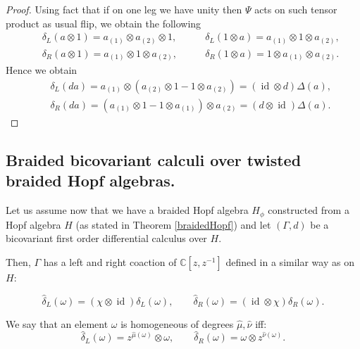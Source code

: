 \documentclass[12pt]{amsart}
\theoremstyle{definition}
\numberwithin{equation}{section}
\renewcommand{\a}{\chi}             %
\newcommand{\C}{\mathbb{C}}         %
\newcommand{\ox}{\otimes}           %
\DeclareMathOperator{\id}{id}       %
\begin{document}
\begin{proof}
Using fact that if on one leg we have unity then $\Psi$ acts on such tensor product as usual flip, we obtain the following
$$
\begin{aligned}
&& \delta_L(a\ox 1)=a_{(1)}\ox a_{(2)}\ox 1 , \qquad & \delta_L(1\ox a)=a_{(1)}\ox 1\ox a_{(2)}, \\
&& \delta_R(a\otimes 1)=a_{(1)}\ox 1 \ox a_{(2)}, \qquad & \delta_R(1\ox a)=1\ox a_{(1)}\ox a_{(2)}.
\end{aligned}
$$
Hence we obtain 
$$
\begin{aligned}
&& \delta_L(da)=a_{(1)}\ox\left(a_{(2)}\otimes 1-1\otimes a_{(2)}\right)=(\id\ox d)\Delta(a),\\
&& \delta_R(da)=\left(a_{(1)}\ox 1 -1\ox a_{(1)}\right)\ox a_{(2)}=(d\ox\id)\Delta(a).
\end{aligned}
$$
\end{proof}

\subsection{Braided bicovariant calculi over twisted braided Hopf algebras.}

Let us assume now that we have a braided Hopf algebra $H_\phi$ constructed from 
a Hopf algebra $H$ (as stated in Theorem \ref{braidedHopf}) and let $(\Gamma, d)$ be 
a bicovariant first order differential calculus over $H$. 

Then, $\Gamma$ has a left and right coaction of $\C[z,z^{-1}]$ defined 
in a similar way as on $H$:

$$ \hat{\delta}_L( \omega) = (\a \ox \id) \delta_L (\omega), \qquad
\hat{\delta}_R( \omega) = (\id \ox \a) \delta_R (\omega).$$

We say that an element $\omega$ is homogeneous of degrees 
$\hat{\mu},\hat{\nu}$ iff:
$$ \hat{\delta}_L(\omega) = z^{\hat{\mu}(\omega)} \ox \omega, \qquad
 \hat{\delta}_R(\omega) = \omega \ox z^{\hat{\nu}(\omega)}.$$
\end{document}
